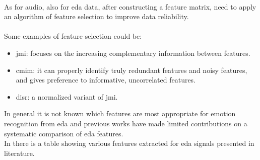 \\ \indent
As for audio, also for \gls{eda} data, after constructing a feature matrix, need to apply an algorithm of feature selection to improve data reliability.
\\ \\
Some examples of feature selection could be:
\begin{itemize}
	\item \gls{jmi}: focuses on the increasing complementary information between features.
	\item \gls{cmim}: it can properly identify truly redundant features and noisy features, and gives preference to informative, uncorrelated features.
	\item \gls{disr}: a normalized variant of \gls{jmi}.
\end{itemize}
In general it is not known which features are most appropriate for emotion recognition from \gls{eda} and previous works have made limited contributions on a systematic comparison of \gls{eda} features.
\\
In \cite{shukla2019feature} there is a table showing various features extracted for \gls{eda} signals presented in literature.